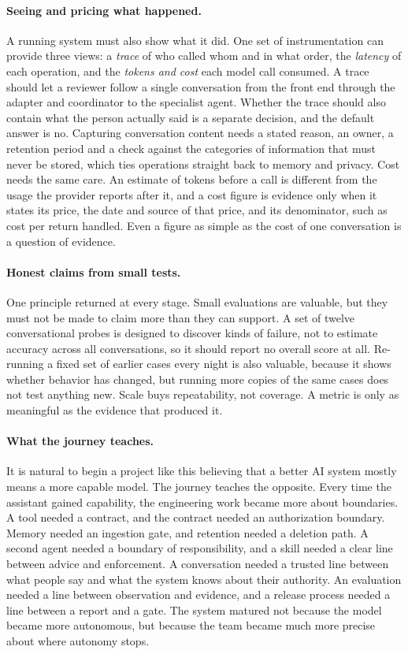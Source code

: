 \paragraph{Seeing and pricing what happened.} A running system must also show what it did. One set of instrumentation can provide three views: a \emph{trace} of who called whom and in what order, the \emph{latency} of each operation, and the \emph{tokens and cost} each model call consumed. A trace should let a reviewer follow a single conversation from the front end through the adapter and coordinator to the specialist agent. Whether the trace should also contain what the person actually said is a separate decision, and the default answer is no. Capturing conversation content needs a stated reason, an owner, a retention period and a check against the categories of information that must never be stored, which ties operations straight back to memory and privacy. Cost needs the same care. An estimate of tokens before a call is different from the usage the provider reports after it, and a cost figure is evidence only when it states its price, the date and source of that price, and its denominator, such as cost per return handled. Even a figure as simple as the cost of one conversation is a question of evidence.

\paragraph{Honest claims from small tests.} One principle returned at every stage. Small evaluations are valuable, but they must not be made to claim more than they can support. A set of twelve conversational probes is designed to discover kinds of failure, not to estimate accuracy across all conversations, so it should report no overall score at all. Re-running a fixed set of earlier cases every night is also valuable, because it shows whether behavior has changed, but running more copies of the same cases does not test anything new. Scale buys repeatability, not coverage. A metric is only as meaningful as the evidence that produced it.

\paragraph{What the journey teaches.} It is natural to begin a project like this believing that a better AI system mostly means a more capable model. The journey teaches the opposite. Every time the assistant gained capability, the engineering work became more about boundaries. A tool needed a contract, and the contract needed an authorization boundary. Memory needed an ingestion gate, and retention needed a deletion path. A second agent needed a boundary of responsibility, and a skill needed a clear line between advice and enforcement. A conversation needed a trusted line between what people say and what the system knows about their authority. An evaluation needed a line between observation and evidence, and a release process needed a line between a report and a gate. The system matured not because the model became more autonomous, but because the team became much more precise about where autonomy stops.

